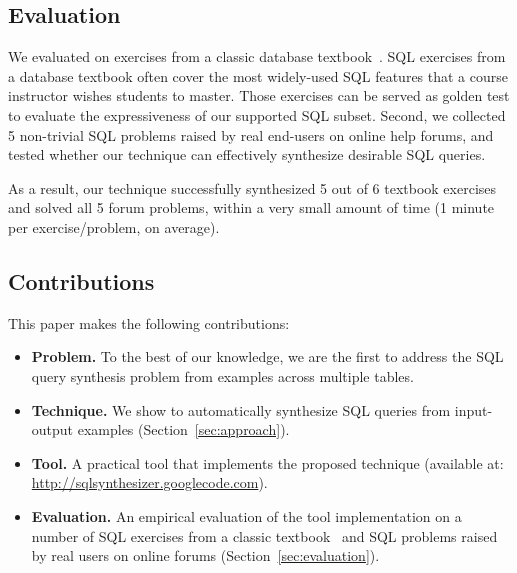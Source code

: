 


\subsection{Evaluation}

We evaluated \ourtool on \exnum 
exercises from a classic database textbook~\cite{cowbook}. 
SQL exercises
from a database textbook often cover
the most widely-used SQL features 
that a course instructor wishes students to master.
Those exercises can be served as golden test
to evaluate the expressiveness of our supported SQL subset. 
Second,
we collected 5 non-trivial SQL problems raised by real end-users on online
help forums, and tested whether our technique can effectively synthesize desirable
SQL queries.  

As a result, our technique successfully synthesized 5 out of 6
textbook exercises and solved all 5 forum problems, within a very
small amount of time (1 minute per exercise/problem, on average).

\subsection{Contributions}

This paper makes the following contributions:

\begin{itemize}
\item \textbf{Problem.} To the best of our knowledge, we are the first
to address the SQL query synthesis problem from examples across multiple
tables.

\item \textbf{Technique.} We show to automatically synthesize SQL
queries from input-output examples (Section~\ref{sec:approach}).

\item \textbf{Tool.} A practical tool that implements the proposed technique (available at:
\url{http://sqlsynthesizer.googlecode.com}).

\item \textbf{Evaluation.} An empirical evaluation of the tool implementation
on a number of SQL exercises from a classic textbook~\cite{cowbook}
and SQL problems raised by real users on online forums (Section~\ref{sec:evaluation}).
\end{itemize}
